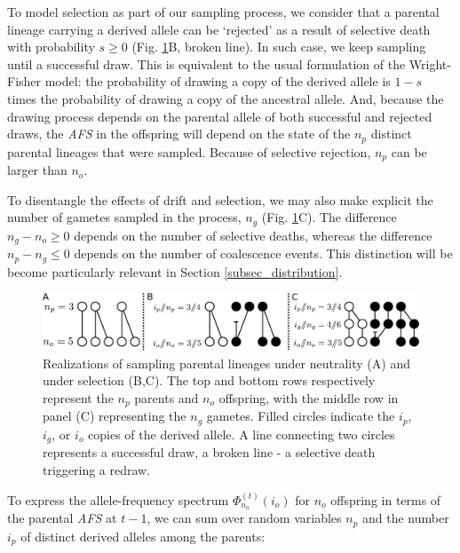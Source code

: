 \documentclass[review]{elsarticle}
\newcommand{\afs}[2]{\Phi_{#1}^{(#2)}}
\begin{document}
To model selection as part of our sampling process, we consider that a parental lineage carrying a
derived allele can be `rejected' as a result of selective death with probability $s\ge0$ (Fig.
\ref{fig_schematic}B, broken line). In such case, we keep sampling until a successful draw. This is
equivalent to the usual formulation of the Wright-Fisher model: the probability of drawing a copy of the
derived allele is $1-s$ times the probability of drawing a copy of the ancestral allele. And, because the drawing
process depends on the parental allele of both successful and rejected draws, the \textit{AFS} in the
offspring will depend on the state of the $n_p$ distinct parental lineages that were sampled. 
Because of selective rejection, $n_p$ can be larger than
$n_o$. 

To disentangle the effects of drift and selection, we may also make explicit the number of gametes
sampled in the process, $n_g$ (Fig. \ref{fig_schematic}C). The difference $n_g-n_o  \ge 0$
depends on the number of selective deaths, whereas the difference $n_p-n_g \le 0$ depends
on the number of coalescence events. This distinction will be become particularly relevant in Section
\ref{subsec_distribution}. 

\begin{figure}[h]
  \centering
  \includegraphics[width=1.0\textwidth]{fig/schematic.pdf}
  \caption{\label{fig_schematic} Realizations of sampling parental lineages under neutrality (A) and
    under selection (B,C). The top and bottom rows respectively represent the $n_p$ parents and
    $n_o$ offspring, with the middle row in panel (C) representing the $n_g$ gametes. Filled circles
    indicate the $i_p$, $i_g$, or $i_o$ copies of the derived allele. A line connecting two circles
    represents a successful draw, a broken line - a selective death triggering a redraw. }
\end{figure}

To express the allele-frequency spectrum $\afs{n_o}{t}(i_o)$ for $n_o$ offspring in terms of the parental
\textit{AFS} at $t-1$, we can sum over random variables $n_p$ and the number $i_p$ of distinct derived alleles
among the parents:
\end{document}

